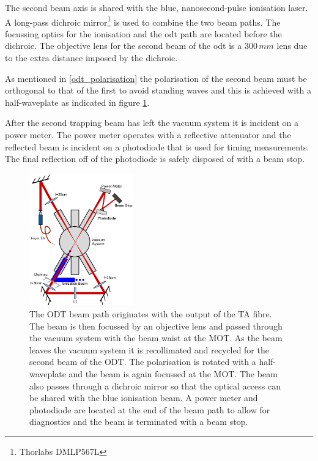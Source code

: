 The second beam axis is shared with the blue, nanosecond-pulse ionisation laser. A long-pass dichroic mirror\footnote{Thorlabs DMLP567L} is used to combine the two beam paths. The focussing optics for the ionisation and the \gls{odt} path are located before the dichroic. The objective lens for the second beam of the \gls{odt} is a $300\,\unit{mm}$ lens due to the extra distance imposed by the dichroic.

As mentioned in \ref{odt_polarisation} the polarisation of the second beam must be orthogonal to that of the first to avoid standing waves and this is achieved with a half-waveplate as indicated in figure \ref{fig:dipole_rig}.

After the second trapping beam has left the vacuum system it is incident on a power meter. The power meter operates with a reflective attenuator and the reflected beam is incident on a photodiode that is used for timing measurements. The final reflection off of the photodiode is safely disposed of with a beam stop.

\begin{figure}[h]
\centering
\includegraphics[width=0.4\textwidth]{figs/DipoleTrapRig.pdf}
\caption{The ODT beam path originates with the output of the TA fibre. The beam is then focussed by an objective lens and passed through the vacuum system with the beam waist at the MOT. As the beam leaves the vacuum system it is recollimated and recycled for the second beam of the ODT. The polarisation is rotated with a half-waveplate and the beam is again focussed at the MOT. The beam also passes through a dichroic mirror so that the optical access can be shared with the blue ionisation beam. A power meter and photodiode are located at the end of the beam path to allow for diagnostics and the beam is terminated with a beam stop.}
\label{fig:dipole_rig}
\end{figure}

